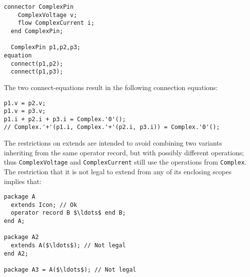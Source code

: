 \begin{example}
\begin{lstlisting}[language=modelica]
  connector ComplexPin
    ComplexVoltage v;
    flow ComplexCurrent i;
  end ComplexPin;

  ComplexPin p1,p2,p3;
equation
  connect(p1,p2);
  connect(p1,p3);
\end{lstlisting}
The two connect-equations result in the following connection equations:
\begin{lstlisting}[language=modelica]
p1.v = p2.v;
p1.v = p3.v;
p1.i + p2.i + p3.i = Complex.'0'();
// Complex.'+'(p1.i, Complex.'+'(p2.i, p3.i)) = Complex.'0'();
\end{lstlisting}
The restrictions on extends are intended to avoid combining two variants inheriting from the same operator record, but with possibly different operations; thus \lstinline!ComplexVoltage! and \lstinline!ComplexCurrent! still use the operations from \lstinline!Complex!.  The restriction that it is not legal to extend from any of its enclosing scopes implies that:
\begin{lstlisting}[language=modelica]
package A
  extends Icon; // Ok
  operator record B $\ldots$ end B;
end A;

package A2
  extends A($\ldots$); // Not legal
end A2;

package A3 = A($\ldots$); // Not legal
\end{lstlisting}
\end{example}
